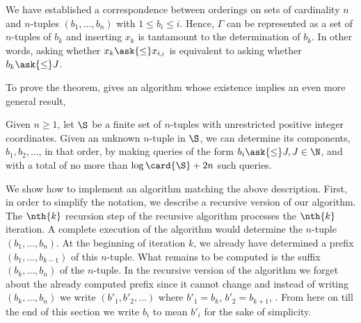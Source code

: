 We have established a correspondence between orderings on sets of cardinality
$n$ and $n$-tuples $(b_1, \ldots, b_n)$ with $1 \le b_i \le i$. Hence, $\Gamma$
can be represented as a set of $n$-tuples of $b_k$ and inserting $x_k$ is
tantamount to the determination of $b_k$. In other words, asking whether $x_k
\ask{\le} x_{i_J}$ is equivalent to asking whether $b_k \ask{\le} J$.

To prove the theorem, \citet{fredman:1976} gives an algorithm whose existence
implies an even more general result,
\begin{lemma}
Given $n \ge 1$, let $\S$ be a finite set of $n$-tuples with unrestricted
positive integer coordinates. Given an unknown $n$-tuple in $\S$, we can
determine its components, \(b_1, b_2, \ldots\), in that order, by making queries
of the form \(b_i \ask{\le} J, J \in \N\), and with a total of no more than $\log \card{\S}
+ 2n$ such queries.
\end{lemma}
We show how to implement an algorithm matching the above description. First, in
order to simplify the notation, we describe a recursive version of our
algorithm. The $\nth{k}$ recursion step of the recursive algorithm processes
the $\nth{k}$ iteration. A complete execution of the algorithm would determine
the $n$-tuple $(b_1, \ldots, b_n)$.  At the beginning of iteration $k$, we
already have determined a prefix $(b_1, \ldots, b_{k-1})$ of this $n$-tuple.
What remains to be computed is the suffix $(b_k, \ldots, b_n)$ of the
$n$-tuple. In the recursive version of the algorithm we forget about the
already computed prefix since it cannot change and instead of writing $(b_k,
\ldots, b_n)$ we write $(b'_1, b'_2, \ldots)$ where $b'_1 = b_k$, $b'_2 =
b_{k+1}$, \etc. From here on till the end of this section we write $b_i$ to
mean $b'_i$ for the sake of simplicity.

